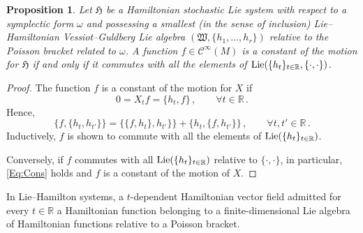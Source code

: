 \documentclass[11pt]{article}
\theoremstyle{plain}
\newtheorem{proposition}[theorem]{Proposition}
\theoremstyle{definition}
\newcommand{\R}{\mathbb{R}}
\newcommand{\Cinfty}{\mathscr{C}^\infty}
\begin{document}
\begin{proposition}
    Let $\mathfrak{H}$ be a Hamiltonian stochastic Lie system with respect to a symplectic form $\omega$ and possessing a smallest (in the sense of inclusion) Lie--Hamiltonian Vessiot--Guldberg Lie algebra $(\mathfrak{W},\{h_1,\ldots,h_r\})$ relative to the Poisson bracket related to $\omega$. A function $f\in \Cinfty(M)$ is a constant of the motion for $\mathfrak{H}$ if and only if it commutes with all the elements of ${\rm Lie}(\{h_t\}_{t\in \R},\{\cdot,\cdot\})$.
\end{proposition}
\begin{proof} The function $f$ is a constant of the motion for $X$ if
\begin{equation}\label{Eq:Cons}
0=X_tf=\{h_t,f\}\,,\qquad \forall t\in \mathbb{R}\,.
\end{equation}
Hence, 
$$
\{f,\{h_t,h_{t'}\}\}=\{\{f,h_t\},h_{t'}\}\}+\{h_t,\{f,h_{t'}\}\}\,,\qquad \forall t,t'\in \mathbb{R}\,.
$$
Inductively, $f$ is shown to commute with all the elements of ${\rm Lie}(\{h_t\}_{t\in \mathbb{R}})$. 

Conversely, if $f$ commutes with all ${\rm Lie}(\{h_t\}_{t\in \mathbb{R}})$ relative to $\{\cdot,\cdot\}$, in particular, \eqref{Eq:Cons} holds and $f$ is a constant of the motion of $X$.
\end{proof}

In Lie--Hamilton systems, a $t$-dependent Hamiltonian vector field admitted for every $t\in \mathbb{R}$ a Hamiltonian function belonging to a finite-dimensional Lie algebra of Hamiltonian functions relative to a Poisson bracket. 

\end{document}
